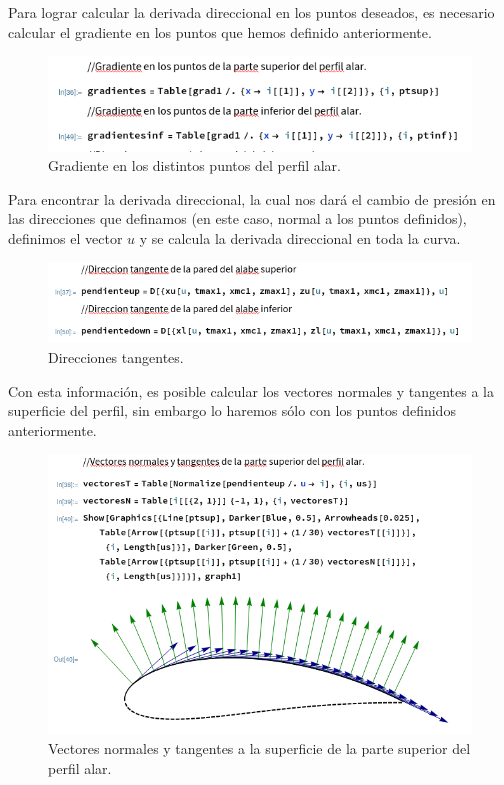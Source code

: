 \documentclass[12pt, letterpaper]{article}
\begin{document}
Para lograr calcular la derivada direccional en los puntos deseados, es necesario calcular el gradiente en los puntos que hemos definido anteriormente.

\begin{figure}[H]
	\centering
	\includegraphics[width=\textwidth]{13.png}
	\caption{Gradiente en los distintos puntos del perfil alar.}
\end{figure}

Para encontrar la derivada direccional, la cual nos dará el cambio de presión en las direcciones que definamos (en este caso, normal a los puntos definidos), definimos el vector $u$ y se calcula la derivada direccional en toda la curva.

\begin{figure}[H]
	\centering
	\includegraphics[width=\textwidth]{14.png}
	\caption{Direcciones tangentes.}
\end{figure}

Con esta información, es posible calcular los vectores normales y tangentes a la superficie del perfil, sin embargo lo haremos sólo con los puntos definidos anteriormente.

\begin{figure}[H]
	\centering
	\includegraphics[width=\textwidth]{15.png}
	\caption{Vectores normales y tangentes a la superficie de la parte superior del perfil alar.}
\end{figure}
\end{document}
